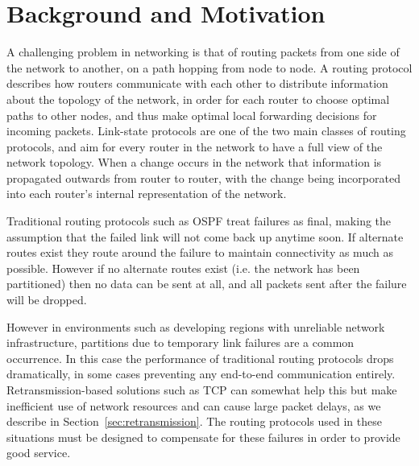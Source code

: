 \documentclass[withindex,glossary,openany]{cam-thesis}
\begin{document}
\section{Background and Motivation}

A challenging problem in networking is that of routing packets from one side of the network to another, on a path hopping from node to node. A routing protocol describes how routers communicate with each other to distribute information about the topology of the network, in order for each router to choose optimal paths to other nodes, and thus make optimal local forwarding decisions for incoming packets. Link-state protocols \cite{LSR_PROTOCOL} are one of the two main classes of routing protocols, and aim for every router in the network to have a full view of the network topology. When a change occurs in the network that information is propagated outwards from router to router, with the change being incorporated into each router's internal representation of the network.

Traditional routing protocols such as OSPF treat failures as final, making the assumption that the failed link will not come back up anytime soon. If alternate routes exist they route around the failure to maintain connectivity as much as possible. However if no alternate routes exist (i.e. the network has been partitioned) then no data can be sent at all, and all packets sent after the failure will be dropped.



However in environments such as developing regions with unreliable network infrastructure, partitions due to temporary link failures are a common occurrence. In this case the performance of traditional routing protocols drops dramatically, in some cases preventing any end-to-end communication entirely. Retransmission-based solutions such as TCP can somewhat help this but make inefficient use of network resources and can cause large packet delays, as we describe in Section~\ref{sec:retransmission}. The routing protocols used in these situations must be designed to compensate for these failures in order to provide good service.

\end{document}
